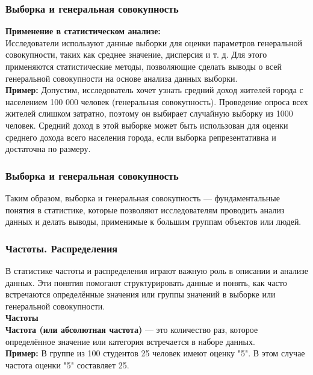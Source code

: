 \documentclass[aspectratio=169]{beamer}
\begin{document}
\begin{frame}
\frametitle{Выборка и генеральная совокупность}
\textbf{Применение в статистическом анализе:}
\newline\\
Исследователи используют данные выборки для оценки параметров генеральной совокупности, таких как среднее значение, дисперсия и т. д. Для этого применяются статистические методы, позволяющие сделать выводы о всей генеральной совокупности на основе анализа данных выборки.
\newline\\
\textbf{Пример:} Допустим, исследователь хочет узнать средний доход жителей города с населением 100 000 человек (генеральная совокупность). Проведение опроса всех жителей слишком затратно, поэтому он выбирает случайную выборку из 1000 человек. Средний доход в этой выборке может быть использован для оценки среднего дохода всего населения города, если выборка репрезентативна и достаточна по размеру.
\end{frame}

\begin{frame}
\frametitle{Выборка и генеральная совокупность}
Таким образом, выборка и генеральная совокупность — фундаментальные понятия в статистике, которые позволяют исследователям проводить анализ данных и делать выводы, применимые к большим группам объектов или людей.
\end{frame}

\begin{frame}
\frametitle{Частоты. Распределения}
В статистике частоты и распределения играют важную роль в описании и анализе данных. Эти понятия помогают структурировать данные и понять, как часто встречаются определённые значения или группы значений в выборке или генеральной совокупности.
\newline\\
\textbf{Частоты}
\newline\\
\textbf{Частота (или абсолютная частота)} — это количество раз, которое определённое значение или категория встречается в наборе данных.
\newline\\
\textbf{Пример:} В группе из 100 студентов 25 человек имеют оценку "5". В этом случае частота оценки "5" составляет 25.
\end{frame}
\end{document}
